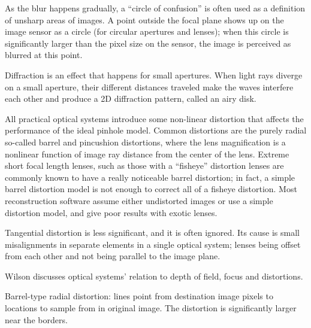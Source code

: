 As the blur happens gradually, a ``circle of confusion'' is often used as a definition of unsharp areas of images.
A point outside the focal plane shows up on the image sensor as a circle (for circular apertures and lenses); when this circle is significantly larger than the pixel size on the sensor, the image is perceived as blurred at this point.



Diffraction is an effect that happens for small apertures.
When light rays diverge on a small aperture, their different distances traveled make the waves interfere each other and produce a 2D diffraction pattern, called an airy disk.



All practical optical systems introduce some non-linear distortion that affects the performance of the ideal pinhole model.
Common distortions are the purely radial so-called barrel and pincushion distortions, where the lens magnification is a nonlinear function of image ray distance from the center of the lens.
\cite{brown1966decentering}
Extreme short focal length lenses, such as those with a ``fisheye'' distortion lenses are commonly known to have a really noticeable barrel distortion; in fact, a simple barrel distortion model is not enough to correct all of a fisheye distortion.
Most reconstruction software assume either undistorted images or use a simple distortion model, and give poor results with exotic lenses.

Tangential distortion is less significant, and it is often ignored. Its cause is small misalignments in separate elements in a single optical system; lenses being offset from each other and not being parallel to the image plane. \cite{kingslake1989history}

Wilson \cite{wilson2004anton} discusses optical systems' relation to depth of field, focus and distortions.


{Barrel-type radial distortion: lines point from destination image pixels to locations to sample from in original image.
The distortion is significantly larger near the borders.}

